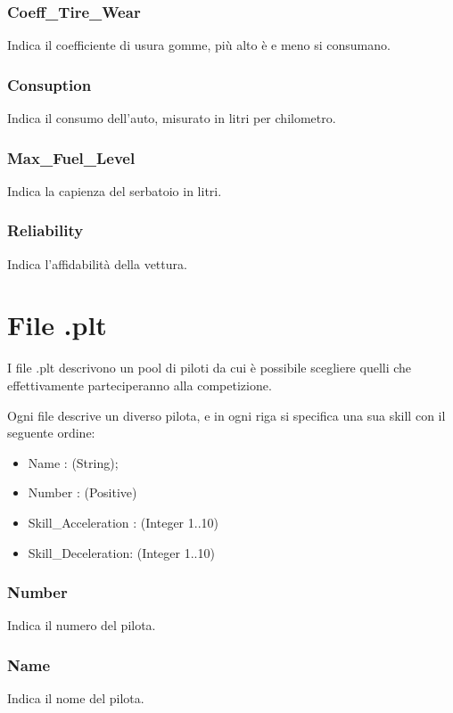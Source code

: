 \documentclass[a4paper,11pt, twoside]{book}
\begin{document}
	\subsubsection{Coeff\_Tire\_Wear}
	  Indica il coefficiente di usura gomme, più alto è e meno si consumano.

	\subsubsection{Consuption} 
	  Indica il consumo dell'auto, misurato in litri per chilometro.

	\subsubsection{Max\_Fuel\_Level}
	  Indica la capienza del serbatoio in litri.
	  
	\subsubsection{Reliability}
	  Indica l'affidabilità della vettura.
      
      \section{File .plt}
	I file .plt descrivono un pool di piloti da cui è possibile scegliere quelli che effettivamente parteciperanno alla
	competizione.
	
	Ogni file descrive un diverso pilota, e in ogni riga si specifica una sua skill con il seguente ordine:
	
	\begin{itemize}
	  \item Name : (String);
	  \item Number : (Positive)
	  \item Skill\_Acceleration : (Integer 1..10)
	  \item Skill\_Deceleration: (Integer 1..10)
	\end{itemize}

	\subsubsection{Number}
	  Indica il numero del pilota.

	\subsubsection{Name}
	  Indica il nome del pilota.
\end{document}
